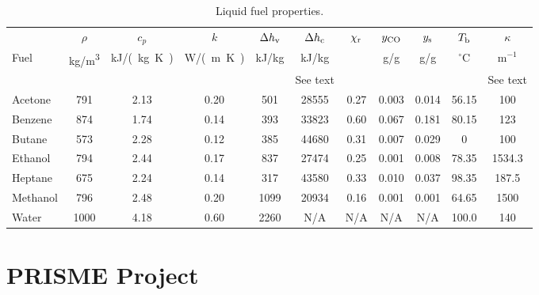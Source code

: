 \begin{table}[h!]
\begin{center}
\caption[Liquid fuel properties]{Liquid fuel properties.} \label{fuelprops}
\begin{tabular}{|l|c|c|c|c|c|c|c|c|c|c|} \hline
        & $\rho$               & $c_p$                        & $k$                &  $\Delta h_{\rm v}$         &  $\Delta h_{\rm c}$  & $\chi_{\rm r}$       & $y_{\rm CO}$         & $y_{\rm s}$          & $T_{\rm b}$                    & $\kappa$  \\
Fuel    & \si{\kg/\m^3}        & \si{\kJ/(\kg.\K)}            & \si{\W/(\m.\K)}    & \si{\kJ/\kg}                & \si{\kJ/\kg}         &                      &  \si{\g/\g}          &  \si{\g/\g}          & $^\circ$C                      & m$^{-1}$  \\
        & \cite{Babrauskas:1}  & \cite{Webbook:HeatCapacity}  & \cite{CRCHandbook} &  \cite{Webbook:FluidThermo} & See text             & \cite{SFPE:Tewarson} & \cite{SFPE:Tewarson} & \cite{SFPE:Tewarson} & \cite{Webbook:BoilingPoint}    & See text  \\
\hline \hline
Acetone  &  791  &  2.13   & 0.20  &   501   & 28555  & 0.27 & 0.003 & 0.014 & 56.15 & 100    \\ \hline
Benzene  &  874  &  1.74   & 0.14  &   393   & 33823  & 0.60 & 0.067 & 0.181 & 80.15 & 123    \\ \hline
Butane   &  573  &  2.28   & 0.12  &   385   & 44680  & 0.31 & 0.007 & 0.029 & 0     & 100    \\ \hline
Ethanol  &  794  &  2.44   & 0.17  &   837   & 27474  & 0.25 & 0.001 & 0.008 & 78.35 & 1534.3 \\ \hline
Heptane  &  675  &  2.24   & 0.14  &   317   & 43580  & 0.33 & 0.010 & 0.037 & 98.35 & 187.5  \\ \hline
Methanol &  796  &  2.48   & 0.20  &   1099  & 20934  & 0.16 & 0.001 & 0.001 & 64.65 & 1500   \\ \hline
Water    & 1000  &  4.18   & 0.60  &   2260  & N/A    & N/A  & N/A   & N/A   & 100.0 & 140    \\ \hline
\end{tabular}
\end{center}
\end{table}


\section{PRISME Project}
\label{PRISME_Description}


